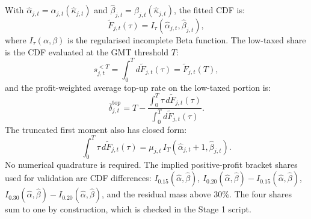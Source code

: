 \documentclass[11pt,a4paper]{article}
\begin{document}
With $\hat{\alpha}_{j,t}=\alpha_{j,t}(\hat{\kappa}_{j,t})$ and $\hat{\beta}_{j,t}=\beta_{j,t}(\hat{\kappa}_{j,t})$, the fitted CDF is:
\begin{equation}\label{eq:beta_cdf}
\tilde{F}_{j,t}(\tau) = I_{\tau}\!\left(\hat{\alpha}_{j,t},\hat{\beta}_{j,t}\right),
\end{equation}
where $I_{\tau}(\alpha,\beta)$ is the regularised incomplete Beta function. The low-taxed share is the CDF evaluated at the GMT threshold $T$:
\begin{equation}\label{eq:lowtax_share}
s_{j,t}^{<T} = \int_0^{T} d\tilde{F}_{j,t}(\tau) = \tilde{F}_{j,t}(T),
\end{equation}
and the profit-weighted average top-up rate on the low-taxed portion is:
\begin{equation}\label{eq:avg_topup_rate}
\bar{\delta}_{j,t}^{\text{top}} = T - \frac{\int_0^{T} \tau \, d\tilde{F}_{j,t}(\tau)}{\int_0^{T} d\tilde{F}_{j,t}(\tau)}.
\end{equation}
The truncated first moment also has closed form:
\begin{equation}\label{eq:beta_truncated_moment}
\int_0^{T} \tau \, d\tilde{F}_{j,t}(\tau)
= \mu_{j,t}\,I_T\!\left(\hat{\alpha}_{j,t}+1,\hat{\beta}_{j,t}\right).
\end{equation}
No numerical quadrature is required. The implied positive-profit bracket shares used for validation are CDF differences: $I_{0.15}(\hat{\alpha},\hat{\beta})$, $I_{0.20}(\hat{\alpha},\hat{\beta})-I_{0.15}(\hat{\alpha},\hat{\beta})$, $I_{0.30}(\hat{\alpha},\hat{\beta})-I_{0.20}(\hat{\alpha},\hat{\beta})$, and the residual mass above 30\%. The four shares sum to one by construction, which is checked in the Stage 1 script.
\end{document}
